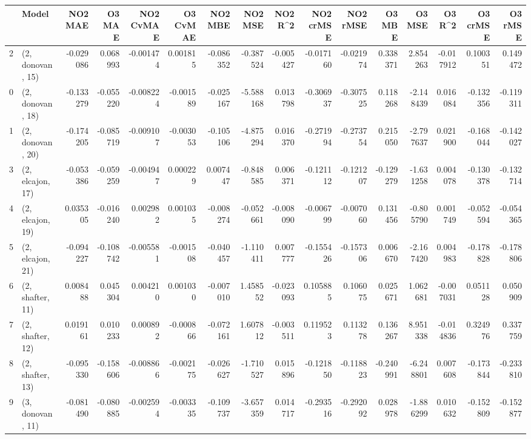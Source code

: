 \begin{tabular}{llrrrrrrrrrrrrrr}
\toprule
{} &             Model &   NO2 MAE &    O3 MAE &  NO2 CvMAE &  O3 CvMAE &   NO2 MBE &    NO2 MSE &   NO2 R\textasciicircum2 &  NO2 crMSE &  NO2 rMSE &    O3 MBE &     O3 MSE &    O3 R\textasciicircum2 &  O3 crMSE &   O3 rMSE \\
\midrule
2  &  (2, donovan, 15) & -0.029086 &  0.068993 &  -0.001474 &  0.001815 & -0.086352 &  -0.387524 & -0.005427 &  -0.017160 & -0.021974 &  0.338371 &   2.854263 & -0.017912 &  0.100351 &  0.149472 \\
0  &  (2, donovan, 18) & -0.133279 & -0.055220 &  -0.008224 & -0.001589 & -0.025167 &  -5.588168 &  0.013798 &  -0.306937 & -0.307525 &  0.118268 &  -2.148439 &  0.016084 & -0.132356 & -0.119311 \\
1  &  (2, donovan, 20) & -0.174205 & -0.085719 &  -0.009107 & -0.003053 & -0.105106 &  -4.875294 &  0.016370 &  -0.271994 & -0.273754 &  0.215050 &  -2.797637 &  0.021900 & -0.168044 & -0.142027 \\
3  &  (2, elcajon, 17) & -0.053386 & -0.059259 &  -0.004947 &  0.000229 &  0.007447 &  -0.848585 &  0.006371 &  -0.121112 & -0.121207 & -0.129279 &  -1.631258 &  0.004078 & -0.130378 & -0.132714 \\
4  &  (2, elcajon, 19) &  0.035305 & -0.016240 &   0.002982 &  0.001035 & -0.008274 &  -0.052661 & -0.008090 &  -0.006799 & -0.007060 &  0.131456 &  -0.805790 &  0.001749 & -0.052594 & -0.054365 \\
5  &  (2, elcajon, 21) & -0.094227 & -0.108742 &  -0.005581 & -0.001508 & -0.040457 &  -1.110411 &  0.007777 &  -0.155426 & -0.157306 &  0.006670 &  -2.167420 &  0.004983 & -0.178828 & -0.178806 \\
6  &  (2, shafter, 11) &  0.008488 &  0.045304 &   0.004210 &  0.001030 & -0.007010 &   1.458552 & -0.023093 &   0.105885 &  0.106075 &  0.025671 &   1.062681 & -0.007031 &  0.051128 &  0.050909 \\
7  &  (2, shafter, 12) &  0.019161 &  0.010233 &   0.000892 & -0.000866 & -0.072161 &   1.607812 & -0.003511 &   0.119523 &  0.113278 &  0.136267 &   8.951338 & -0.014836 &  0.324976 &  0.337759 \\
8  &  (2, shafter, 13) & -0.095330 & -0.158606 &  -0.008866 & -0.002175 & -0.026627 &  -1.710527 &  0.015896 &  -0.121850 & -0.118823 & -0.240991 &  -6.248801 &  0.007608 & -0.173844 & -0.233810 \\
9  &  (3, donovan, 11) & -0.081490 & -0.080885 &  -0.002594 & -0.003335 & -0.109737 &  -3.657359 &  0.014717 &  -0.293516 & -0.292092 &  0.028978 &  -1.886299 &  0.010632 & -0.152809 & -0.152877 \\

\end{tabular}

